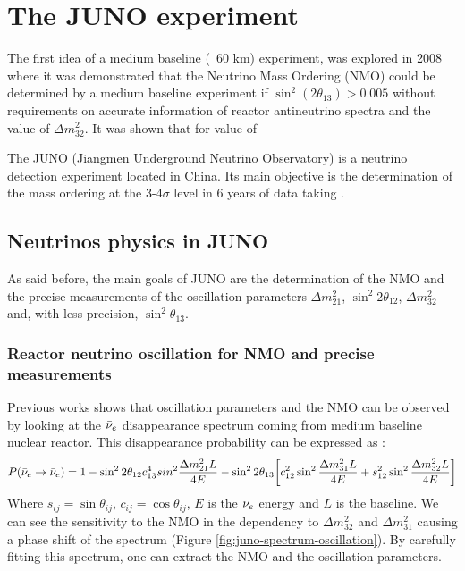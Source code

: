 \chapter{The JUNO experiment}

The first idea of a medium baseline (~60 km) experiment, was explored in 2008 where it was demonstrated that the Neutrino Mass Ordering (NMO) could be determined by a medium baseline experiment if $\sin^2(2\theta_{13}) > 0.005$ without requirements on accurate information of reactor antineutrino spectra and the value of $\Delta m_{32}^2$. \cite{zhan_determination_2008}
It was shown that for value of 


The JUNO (Jiangmen Underground Neutrino Observatory) is a neutrino detection experiment located in China. Its main objective is the determination of the mass ordering at the 3-4$\sigma$ level in 6 years of data taking \cite{an_neutrino_2016}.

\section{Neutrinos physics in JUNO}

As said before, the main goals of JUNO are the determination of the NMO and the precise measurements of the oscillation parameters $\Delta m_{21}^2$, $\sin^2 2\theta_{12}$, $\Delta m_{32}^2$ and, with less precision, $\sin^2\theta_{13}$. 

\subsection{Reactor neutrino oscillation for NMO and precise measurements}

Previous works \cite{zhan_determination_2008,  zhan_experimental_2009} shows that oscillation parameters and the NMO can be observed by looking at the $\bar{\nu}_{e}$ disappearance spectrum coming from medium baseline nuclear reactor. This disappearance probability can be expressed as \cite{an_neutrino_2016} :
\begin{equation*}
  P(\bar{\nu}_{e} \rightarrow \bar{\nu}_{e}) = 1 - \sin^2 2\theta_{12} c^4_{13} sin^2 \frac{\Delta m^2_{21}L}{4E} - \sin^2 2\theta_{13} \bigg[ c_{12}^2 \sin^2 \frac{\Delta m_{31}^2 L}{4E} + s^2_{12} \sin^2 \frac{\Delta m_{32}^2 L}{4E} \bigg]
\end{equation*}
Where $s_{ij} = \sin \theta_{ij}$, $c_{ij} = \cos \theta_{ij}$, $E$ is the $\bar{\nu}_{e}$ energy and $L$ is the baseline.
We can see the sensitivity to the NMO in the dependency to $\Delta m_{32}^2$ and $\Delta m^2_{31}$ causing a phase shift of the spectrum (Figure \ref{fig:juno-spectrum-oscillation}).
By carefully fitting this spectrum, one can extract the NMO and the oscillation parameters.

